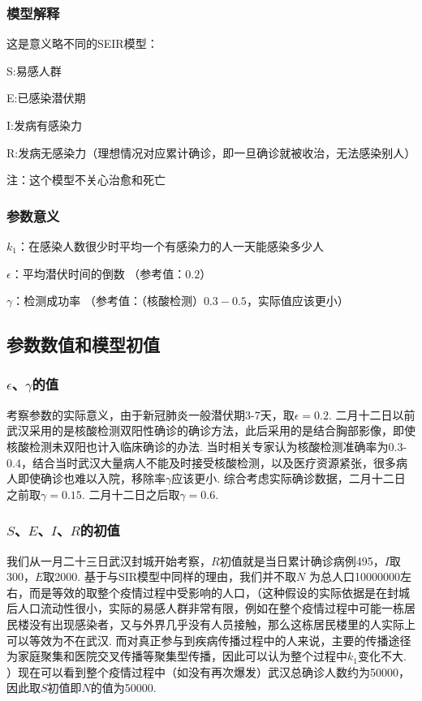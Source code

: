 \documentclass[UTF8]{ctexart}
\begin{document}
		\subsubsection{模型解释}
			这是意义略不同的SEIR模型：
			
			S:易感人群
			
			E:已感染潜伏期
			
			I:发病有感染力
			
			R:发病无感染力（理想情况对应累计确诊，即一旦确诊就被收治，无法感染别人）
			
			注：这个模型不关心治愈和死亡
			
			
		\subsubsection{参数意义}
		$k_1$：在感染人数很少时平均一个有感染力的人一天能感染多少人
		
		$\epsilon$：平均潜伏时间的倒数
		（参考值：$0.2$）
		
		$\gamma$：检测成功率
		（参考值：（核酸检测）$0.3-0.5$，实际值应该更小）
		
		\subsection{参数数值和模型初值}
		
			\subsubsection{$\epsilon$、$\gamma$的值}
				考察参数的实际意义，由于新冠肺炎一般潜伏期3-7天，取$\epsilon = 0.2$. 二月十二日以前武汉采用的是核酸检测双阳性确诊的确诊方法，此后采用的是结合胸部影像，即使核酸检测未双阳也计入临床确诊的办法. 当时相关专家认为核酸检测准确率为0.3-0.4，结合当时武汉大量病人不能及时接受核酸检测，以及医疗资源紧张，很多病人即使确诊也难以入院，移除率$\gamma$应该更小. 综合考虑实际确诊数据，二月十二日之前取$\gamma = 0.15$. 二月十二日之后取$\gamma = 0.6$. 
			
			\subsubsection{$S$、$E$、$I$、$R$的初值}
				我们从一月二十三日武汉封城开始考察，$R$初值就是当日累计确诊病例495，$I$取300，$E$取2000. 基于与SIR模型中同样的理由，我们并不取$N$ 为总人口10000000左右，而是等效的取整个疫情过程中受影响的人口，（这种假设的实际依据是在封城后人口流动性很小，实际的易感人群非常有限，例如在整个疫情过程中可能一栋居民楼没有出现感染者，又与外界几乎没有人员接触，那么这栋居民楼里的人实际上可以等效为不在武汉. 而对真正参与到疾病传播过程中的人来说，主要的传播途径为家庭聚集和医院交叉传播等聚集型传播，因此可以认为整个过程中$k_1$变化不大. ）现在可以看到整个疫情过程中（如没有再次爆发）武汉总确诊人数约为50000，因此取$S$初值即$N$的值为50000.
			
\end{document}
